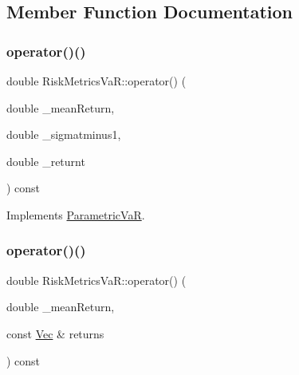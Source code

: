 \subsection{Member Function Documentation}
\hypertarget{classRiskMetricsVaR_a801fc34d2327f8fffc1315a5a9aa9df1}{}\label{classRiskMetricsVaR_a801fc34d2327f8fffc1315a5a9aa9df1} 
\subsubsection{\texorpdfstring{operator()()}{operator()()}\hspace{0.1cm}{\footnotesize\ttfamily [1/3]}}
{\footnotesize\ttfamily double Risk\+Metrics\+Va\+R\+::operator() (\begin{DoxyParamCaption}\item[{double}]{\+\_\+mean\+Return,  }\item[{double}]{\+\_\+sigmatminus1,  }\item[{double}]{\+\_\+returnt }\end{DoxyParamCaption}) const\hspace{0.3cm}{\ttfamily [virtual]}}



Implements \hyperlink{classParametricVaR_a54589e13bb45da786d574656eb67b5fb}{Parametric\+VaR}.

\hypertarget{classRiskMetricsVaR_ab83bde7047dc8e501b8e8ea115cf5e7b}{}\label{classRiskMetricsVaR_ab83bde7047dc8e501b8e8ea115cf5e7b} 
\subsubsection{\texorpdfstring{operator()()}{operator()()}\hspace{0.1cm}{\footnotesize\ttfamily [2/3]}}
{\footnotesize\ttfamily double Risk\+Metrics\+Va\+R\+::operator() (\begin{DoxyParamCaption}\item[{double}]{\+\_\+mean\+Return,  }\item[{const \hyperlink{compute__returns__eigen_8h_a1eb6a9306ef406d7975f3cbf2e247777}{Vec} \&}]{returns }\end{DoxyParamCaption}) const\hspace{0.3cm}{\ttfamily [virtual]}}



